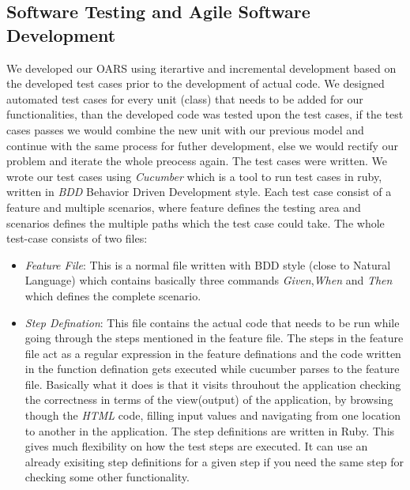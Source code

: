 \documentclass[12pt]{article}
\begin{document}
\subsection{Software Testing and Agile Software Development}
We developed our OARS using iterartive and incremental development based on the developed test cases prior to the development of actual code. We designed automated test cases for every unit (class) that needs to be added for our functionalities, than the developed code was tested upon the test cases, if the test cases passes we would combine the new unit with our previous model and continue with the same process for futher development, else we would rectify our problem and iterate the whole preocess again. The test cases were written. We wrote our test cases using \emph{Cucumber} which is a tool to run test cases in ruby, written in \emph{BDD}  Behavior Driven Development style. Each test case consist of a feature and multiple scenarios, where feature defines the testing area and scenarios defines the multiple paths which the test case could take. The whole test-case consists of two files:
\begin{itemize}
\item \emph{Feature File}: This is a normal file written with BDD style (close to Natural Language) which contains basically three commands \emph{Given},\emph{When} and \emph{Then} which defines the complete scenario.
\item \emph{Step Defination}: This file contains the actual code that needs to
  be run while going through the steps mentioned in the feature file. The
  steps in the feature file act as a regular expression in the feature
  definations and the code written in the function defination gets executed
  while cucumber parses to the feature file. Basically what it does is that it
  visits throuhout the application checking the correctness in terms of the
  view(output) of the application, by browsing though the \emph{HTML} code,
  filling input values and navigating from one location to another in the
  application. The step definitions are written in Ruby. This gives much
  flexibility on how the test steps are executed. It can use an already
  exisiting step definitions for a given step if you need the same step for
  checking some other functionality.
\end{itemize}
\end{document}
